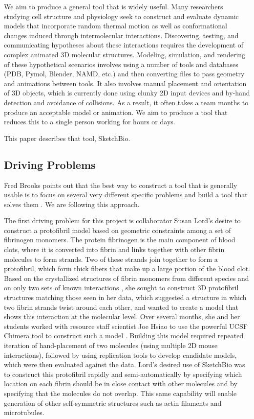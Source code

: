 \documentclass[twocolumn]{bmcart}%
\begin{document}
We aim to produce a general tool that is widely useful.  Many researchers studying cell structure and physiology seek to construct
and evaluate dynamic models that incorporate random thermal motion as
well as conformational changes induced through intermolecular interactions.
Discovering, testing, and communicating hypotheses about these
interactions requires the development of complex animated 3D molecular structures. Modeling, simulation, and rendering
of these hypothetical scenarios involves using a number of tools and databases (PDB, Pymol, Blender, NAMD, etc.)
and then converting files to pass geometry and animations between tools. It also involves
manual placement and orientation of 3D objects, which is currently done using clunky 2D input devices and by-hand
detection and avoidance of collisions. As a result, it often takes a team months to produce an acceptable
model or animation. We aim to produce a tool that reduces this to a single person working for hours or days.

This paper describes that tool, SketchBio.

\subsection*{Driving Problems}
Fred Brooks points out that the best way to construct a tool that is generally usable is to focus on several very different specific problems and build a tool that solves them \cite{Brooks}.
We are following this approach.

The first driving problem for this project is collaborator Susan Lord's desire to construct a protofibril model based on geometric constraints among a set of fibrinogen monomers.
The protein fibrinogen is the main component of blood clots, where it is converted into fibrin and links together with other fibrin molecules to form strands.
Two of these strands join together to form a protofibril, which form thick fibers that make up a large portion of the blood clot.
Based on the crystallized structures of fibrin monomers from different species and on only two sets of known interactions \cite{lord2007fibrinogen}, she sought to construct 3D protofibril structures matching those seen in her data, which suggested a structure in which two fibrin strands twist around each other, and wanted to create a model that shows this interaction at the molecular level.
Over several months, she and her students worked with resource staff scientist Joe Hsiao to use the powerful UCSF Chimera tool to construct such a model \cite{lordSubmitted}.
Building this model required repeated iteration of hand-placement of two molecules (using multiple 2D mouse interactions), followed by using replication tools to develop candidate models, which were then evaluated against the data.
Lord's desired use of SketchBio was to construct this protofibril rapidly and semi-automatically by specifying which location on each fibrin should be in close contact with other molecules and by specifying that the molecules do not overlap.
This same capability will enable generation of other self-symmetric structures such as actin filaments and microtubules.
\end{document}
